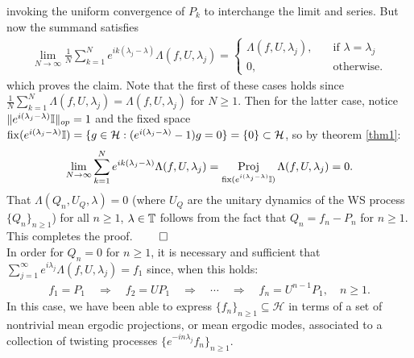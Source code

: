 \documentclass[11pt]{report}
\newcommand{\mc}[1]{\mathcal{#1}}
\newcommand{\1}[1]{\mathbbm{1}_{\{#1\}}}
\DeclareMathOperator{\fix}{fix}
\DeclareMathOperator{\proj}{Proj}
\theoremstyle{definition}
\begin{document}
    invoking the uniform convergence of $P_k$ to interchange the limit and series. But now the summand satisfies
    \begin{align*}
        \lim_{N\rightarrow\infty}\frac{1}{N}\sum_{k=1}^Ne^{ik(\lambda_j-\lambda)}\Lambda(f,U,\lambda_j)=\begin{cases}
            \Lambda(f,U,\lambda_j),\quad&\text{if $\lambda=\lambda_j$}\\
            0,\quad&\text{otherwise}.
        \end{cases}
    \end{align*}
    which proves the claim. Note that the first of these cases holds since $\frac{1}{N}\sum_{k=1}^N\Lambda(f,U,\lambda_j)=\Lambda(f,U,\lambda_j)$ for $N\geq 1$. Then for the latter case, notice $\|e^{i(\lambda_j-\lambda)}\mathbb{I}\|_{op}=1$ and the fixed space $\fix(e^{i(\lambda_j-\lambda)}\mbb{I})=\{g\in\mc{H}:(e^{i(\lambda_j-\lambda)}-1)g=0\}=\{0\}\subset\mc{H}$, so 
    by theorem \ref{thm1}: 
    \begin{align*}
        \lim_{N\rightarrow\infty}\sum_{k=1}^Ne^{ik(\lambda_j-\lambda)}\Lambda(f,U,\lambda_j)=\proj_{\fix(e^{i(\lambda_j-\lambda)}\mbb{I})}\Lambda(f,U,\lambda_j)=0. 
    \end{align*}
    That $\Lambda(Q_n,U_Q,\lambda)=0$ (where $U_Q$ are the unitary dynamics of the WS process $\{Q_n\}_{n\geq 1}$) for all $n\geq 1$, $\lambda\in\mathbb{T}$ follows from the fact that $Q_n=f_n-P_n$ for $n\geq 1$. This completes the proof. \hfill{$\qed$}\\[5pt]
    \indent In order for $Q_n=0$ for $n\geq 1$, it is necessary and sufficient that $\sum_{j=1}^\infty e^{i\lambda_j}\Lambda(f,U,\lambda_j)=f_1$ since, when this holds:
    \begin{align*}
        f_1=P_1\quad\Rightarrow\quad f_2=UP_1\quad\Rightarrow\quad\cdots\quad\Rightarrow\quad f_n=U^{n-1}P_1,\quad n\geq 1.
    \end{align*}
    In this case, we have been able to express $\{f_n\}_{n\geq 1}\subseteq\mc{H}$ in terms of a set of nontrivial mean ergodic projections, or mean ergodic modes, associated to a collection of twisting processes $\{e^{-in\lambda_j}f_n\}_{n\geq 1}$.
\end{document}
